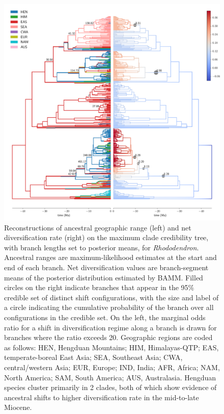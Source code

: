 \documentclass[9pt,twocolumn,twoside,lineno]{pnas-new}
\begin{document}
\begin{figure}
\centering
\includegraphics[width=.85\linewidth]{Rhododendron.pdf}
\caption{Reconstructions of ancestral geographic range (left) and net
  diversification rate (right) on the maximum clade credibility tree,
  with branch lengths set to posterior means, for
  \textit{Rhododendron}. Ancestral ranges are maximum-likelihood
  estimates at the start and end of each branch. Net diversification
  values are branch-segment means of the posterior distribution
  estimated by BAMM. Filled circles on the right indicate branches
  that appear in the 95\% credible set of distinct shift
  configurations, with the size and label of a circle indicating the
  cumulative probability of the branch over all configurations in the
  credible set. On the left, the marginal odds ratio for a shift in
  diversification regime along a branch is drawn for branches where
  the ratio exceeds 20. Geographic regions are coded as follows: HEN,
  Hengduan Mountains; HIM, Himalayas-QTP; EAS, temperate-boreal East
  Asia; SEA, Southeast Asia; CWA, central/western Asia; EUR, Europe;
  IND, India; AFR, Africa; NAM, North America; SAM, South America;
  AUS, Australasia. Hengduan species cluster primarily in 2 clades,
  both of which show evidence of ancestral shifts to higher
  diversification rate in the mid-to-late Miocene.}
\label{fig:rhododendron}
\end{figure}
\end{document}
